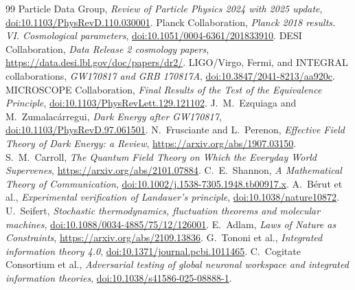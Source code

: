 \documentclass[11pt]{article}
\begin{document}
\begin{thebibliography}{99}
 Particle Data Group, \emph{Review of Particle Physics 2024 with 2025 update}, \href{https://doi.org/10.1103/PhysRevD.110.030001}{doi:10.1103/PhysRevD.110.030001}.
 Planck Collaboration, \emph{Planck 2018 results. VI. Cosmological parameters}, \href{https://doi.org/10.1051/0004-6361/201833910}{doi:10.1051/0004-6361/201833910}.
 DESI Collaboration, \emph{Data Release 2 cosmology papers}, \url{https://data.desi.lbl.gov/doc/papers/dr2/}.
 LIGO/Virgo, Fermi, and INTEGRAL collaborations, \emph{GW170817 and GRB 170817A}, \href{https://doi.org/10.3847/2041-8213/aa920c}{doi:10.3847/2041-8213/aa920c}.
 MICROSCOPE Collaboration, \emph{Final Results of the Test of the Equivalence Principle}, \href{https://doi.org/10.1103/PhysRevLett.129.121102}{doi:10.1103/PhysRevLett.129.121102}.
 J.~M.~Ezquiaga and M.~Zumalac\'arregui, \emph{Dark Energy after GW170817}, \href{https://doi.org/10.1103/PhysRevD.97.061501}{doi:10.1103/PhysRevD.97.061501}.
 N.~Frusciante and L.~Perenon, \emph{Effective Field Theory of Dark Energy: a Review}, \url{https://arxiv.org/abs/1907.03150}.
 S.~M.~Carroll, \emph{The Quantum Field Theory on Which the Everyday World Supervenes}, \url{https://arxiv.org/abs/2101.07884}.
 C.~E.~Shannon, \emph{A Mathematical Theory of Communication}, \href{https://doi.org/10.1002/j.1538-7305.1948.tb00917.x}{doi:10.1002/j.1538-7305.1948.tb00917.x}.
 A.~B\'erut et al., \emph{Experimental verification of Landauer's principle}, \href{https://doi.org/10.1038/nature10872}{doi:10.1038/nature10872}.
 U.~Seifert, \emph{Stochastic thermodynamics, fluctuation theorems and molecular machines}, \href{https://doi.org/10.1088/0034-4885/75/12/126001}{doi:10.1088/0034-4885/75/12/126001}.
 E.~Adlam, \emph{Laws of Nature as Constraints}, \url{https://arxiv.org/abs/2109.13836}.
 G.~Tononi et al., \emph{Integrated information theory 4.0}, \href{https://doi.org/10.1371/journal.pcbi.1011465}{doi:10.1371/journal.pcbi.1011465}.
 C.~Cogitate Consortium et al., \emph{Adversarial testing of global neuronal workspace and integrated information theories}, \href{https://doi.org/10.1038/s41586-025-08888-1}{doi:10.1038/s41586-025-08888-1}.
\end{thebibliography}
\end{document}
